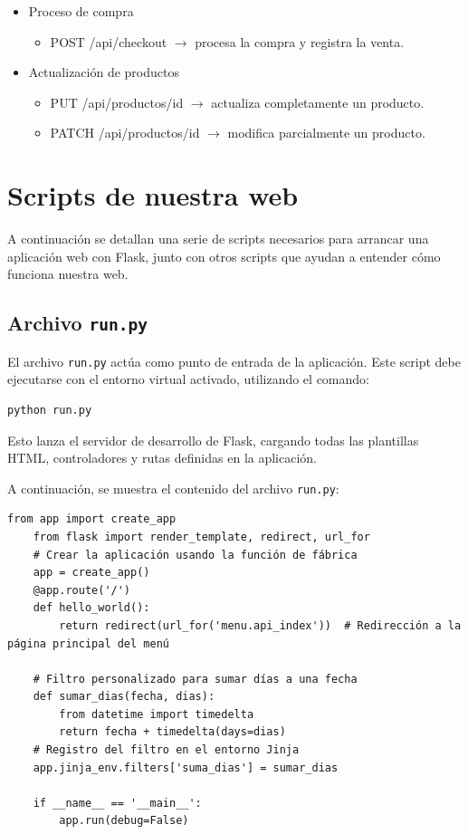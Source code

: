 \documentclass[10pt]{book}
\begin{document}
\begin{itemize}
\begin{itemize}
            \end{itemize}
            \item Proceso de compra
            \begin{itemize}
                \item POST /api/checkout $\rightarrow$ procesa la compra y registra la venta.
            \end{itemize}
            \item Actualización de productos
            \begin{itemize}
                \item PUT /api/productos/{id} $\rightarrow$ actualiza completamente un producto.
                \item PATCH /api/productos/{id} $\rightarrow$ modifica parcialmente un producto.
            \end{itemize}
        \end{itemize}
\newpage
\section{Scripts de nuestra web}
A continuación se detallan una serie de scripts necesarios para arrancar una aplicación web con Flask, junto con otros scripts que ayudan a entender cómo funciona nuestra web.
\subsection{Archivo \texttt{run.py}}

    El archivo \texttt{run.py} actúa como punto de entrada de la aplicación. Este script debe ejecutarse con el entorno virtual activado, utilizando el comando:
    
    \begin{lstlisting}[style=simplebash]
    python run.py
    \end{lstlisting}
    
    Esto lanza el servidor de desarrollo de Flask, cargando todas las plantillas HTML, controladores y rutas definidas en la aplicación.
    
    A continuación, se muestra el contenido del archivo \texttt{run.py}:
    
    \begin{lstlisting}[style=pythonclean, caption={Script principal \texttt{run.py}}]
    from app import create_app
    from flask import render_template, redirect, url_for
    # Crear la aplicación usando la función de fábrica
    app = create_app()
    @app.route('/')
    def hello_world():
        return redirect(url_for('menu.api_index'))  # Redirección a la página principal del menú

    # Filtro personalizado para sumar días a una fecha
    def sumar_dias(fecha, dias):
        from datetime import timedelta
        return fecha + timedelta(days=dias)
    # Registro del filtro en el entorno Jinja
    app.jinja_env.filters['suma_dias'] = sumar_dias

    if __name__ == '__main__':
        app.run(debug=False)
    \end{lstlisting}
    
\end{document}
